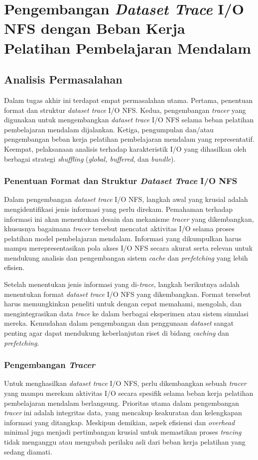 \chapter{Pengembangan \textit{Dataset Trace} I/O NFS dengan Beban Kerja Pelatihan Pembelajaran Mendalam}

\section{Analisis Permasalahan}
Dalam tugas akhir ini terdapat empat permasalahan utama. Pertama, penentuan format dan struktur \textit{dataset trace} I/O NFS. Kedua, pengembangan \textit{tracer} yang digunakan untuk mengembangkan \textit{dataset trace} I/O NFS selama beban pelatihan pembelajaran mendalam dijalankan. Ketiga, pengumpulan dan/atau pengembangan beban kerja pelatihan pembelajaran mendalam yang representatif. Keempat, pelaksanaan analisis terhadap karakteristik I/O yang dihasilkan oleh berbagai strategi \textit{shuffling} (\textit{global, buffered}, dan \textit{bundle}).


\subsection{Penentuan Format dan Struktur \textit{Dataset Trace} I/O NFS}
Dalam pengembangan \textit{dataset trace} I/O NFS, langkah awal yang krusial adalah mengidentifikasi jenis informasi yang perlu direkam. Pemahaman terhadap informasi ini akan menentukan desain dan mekanisme \textit{tracer} yang dikembangkan, khususnya bagaimana \textit{tracer} tersebut mencatat aktivitas I/O selama proses pelatihan model pembelajaran mendalam. Informasi yang dikumpulkan harus mampu merepresentasikan pola akses I/O NFS secara akurat serta relevan untuk mendukung analisis dan pengembangan sistem \textit{cache} dan \textit{prefetching} yang lebih efisien.

Setelah menentukan jenis informasi yang di-\textit{trace}, langkah berikutnya adalah menentukan format \textit{dataset trace} I/O NFS yang dikembangkan. Format tersebut harus memungkinkan peneliti untuk dengan cepat memahami, mengolah, dan mengintegrasikan data \textit{trace} ke dalam berbagai eksperimen atau sistem simulasi mereka. Kemudahan dalam pengembangan dan penggunaan \textit{dataset} sangat penting agar dapat mendukung keberlanjutan riset di bidang \textit{caching} dan \textit{prefetching}.


\subsection{Pengembangan \textit{Tracer}}
Untuk menghasilkan \textit{dataset trace} I/O NFS, perlu dikembangkan sebuah \textit{tracer} yang mampu merekam aktivitas I/O secara spesifik selama beban kerja pelatihan pembelajaran mendalam berlangsung. Prioritas utama dalam pengembangan \textit{tracer} ini adalah integritas data, yang mencakup keakuratan dan kelengkapan informasi yang ditangkap. Meskipun demikian, aspek efisiensi dan \textit{overhead} minimal juga menjadi pertimbangan krusial untuk memastikan proses \textit{tracing} tidak menganggu atau mengubah perilaku asli dari beban kerja pelatihan yang sedang diamati.


